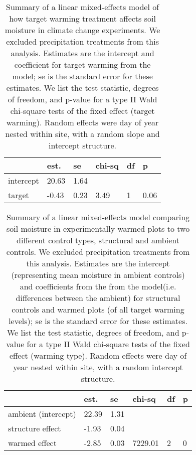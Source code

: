 \documentclass{article}
\begin{document}
\begin{table}[ht]
\centering
\caption{Summary of a linear mixed-effects model of how target warming treatment affects soil moisture in climate change experiments. We excluded precipitation treatments from this analysis. Estimates are the intercept  and coefficient for target warming from the model; se is the standard error for these estimates. We list the test statistic, degrees of freedom, and p-value for a type II Wald chi-square tests of the fixed effect (target warming). Random effects were day of year nested within site, with a random slope and intercept structure.} 
\label{table:targsoilmois}
\begin{tabular}{|p{}|p{}p{}p{}p{}p{}|}
  \hline
 & est. & se & chi-sq & df & p \\ 
  \hline
intercept & 20.63 & 1.64 &  &  &  \\ 
  target & -0.43 & 0.23 & 3.49 & 1 & 0.06 \\ 
   \hline
\end{tabular}
\end{table}%
\begin{table}[ht]
\centering
\caption{Summary of a linear mixed-effects model comparing soil moisture in experimentally warmed plots to two different control types, structural and ambient controls. We excluded precipitation treatments from this analysis. Estimates are the intercept (representing mean moisture in ambient controls)  and coefficients from the from the model(i.e. differences between the ambient) for structural controls and warmed plots (of all target warming levels); se is the standard error for these estimates. We list the test statistic, degrees of freedom, and p-value for a type II Wald chi-square tests of the fixed effect (warming type). Random effects were day of year nested within site, with a random intercept structure.} 
\label{table:warmsoilmois}
\begin{tabular}{|p{}|p{}p{}p{}p{}p{}|}
  \hline
 & est. & se & chi-sq & df & p \\ 
  \hline
ambient (intercept) & 22.39 & 1.31 &  &  &  \\ 
  structure effect & -1.93 & 0.04 &  &  &  \\ 
  warmed effect & -2.85 & 0.03 & 7229.01 & 2 & 0 \\ 
   \hline
\end{tabular}
\end{table}
\end{document}
